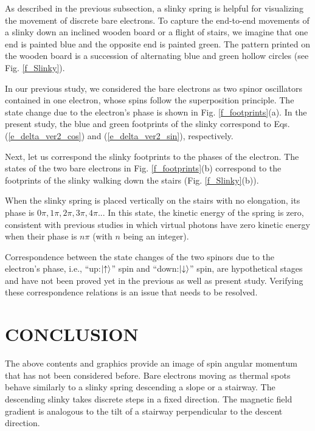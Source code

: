 \documentclass[reprint,amsmath,amssymb,aps,draft]{revtex4-1}
\numberwithin{equation}{section}%
\begin{document}
    As described in the previous subsection, a slinky spring is helpful for visualizing the movement of discrete bare electrons. To capture the end-to-end movements of a slinky down an inclined wooden board or a flight of stairs, we imagine that one end is painted blue and the opposite end is painted green. The pattern printed on the wooden board is a succession of alternating blue and green hollow circles (see Fig. \ref{f_Slinky}).

    In our previous study\cite{Hanamura}, we considered the bare electrons as two spinor oscillators contained in one electron, whose spins follow the superposition principle. The state change due to the electron's phase is shown in Fig. \ref{f_footprints}(a). In the present study, the blue and green footprints of the slinky correspond to Eqs. (\ref{e_delta_ver2_cos}) and (\ref{e_delta_ver2_sin}), respectively.
    
    Next, let us correspond the slinky footprints to the phases of the electron. The states of the two bare electrons in Fig. \ref{f_footprints}(b) correspond to the footprints of the slinky walking down the stairs (Fig. \ref{f_Slinky}(b)).

    When the slinky spring is placed vertically on the stairs with no elongation, its phase is $0\pi,1\pi,2\pi,3\pi,4\pi$... In this state, the kinetic energy of the spring is zero, consistent with previous studies in which virtual photons have zero kinetic energy when their phase is $n\pi$ (with $n$ being an integer).

    Correspondence between the state changes of the two spinors due to the electron's phase, i.e., ``up:$\ket{\uparrow}$'' spin and ``down:$\ket{\downarrow}$'' spin, are hypothetical stages and have not been proved yet in the previous as well as present study. Verifying these correspondence relations is an issue that needs to be resolved.


\section{\label{sec:CONCLUSION}CONCLUSION}


    The above contents and graphics provide an image of spin angular momentum that has not been considered before. Bare electrons moving as thermal spots behave similarly to a slinky spring descending a slope or a stairway. The descending slinky takes discrete steps in a fixed direction. 
    The magnetic field gradient is analogous to the tilt of a stairway perpendicular to the descent direction.
    
\end{document}
